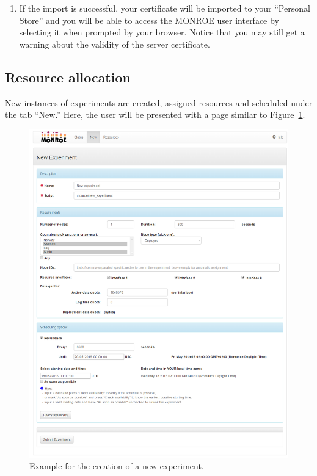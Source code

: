 \documentclass[a4paper,10pt]{article}
\newcommand{\monroe}{MONROE}
\begin{document}
\begin{enumerate}
	\item If the import is successful, your certificate will be imported to your ``Personal Store'' and you will be able to access the \monroe{} user interface by selecting it when prompted by your browser. Notice that you may still get a warning about the validity of the server certificate.
	
\end{enumerate}


\subsection{Resource allocation}
\label{subsec:resourceAllocation}
New instances of experiments are created, assigned resources and scheduled under the tab ``New.''
Here, the user will be presented with a page similar to Figure~\ref{fig:newExperimentBlank}.

\begin{figure}[tp]
	\centering
	\includegraphics[width=1.0\textwidth]{NewExperiment_blank.png}
	\caption{Example for the creation of a new experiment.}
	\label{fig:newExperimentBlank}
\end{figure}
\end{document}
